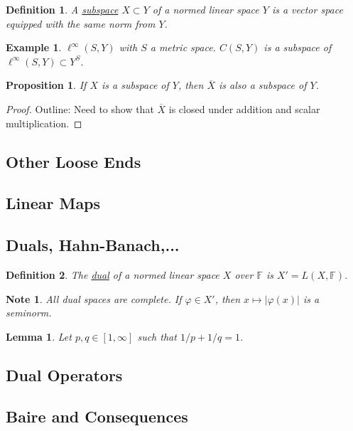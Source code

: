 \documentclass[letterpaper,twoside,11pt]{article}
\theoremstyle{mystyle}
\newtheorem{definition}{Definition}[section]
\newtheorem{lemma}[theorem]{Lemma}
\newtheorem{prop}{Proposition}[section]
\newtheorem*{ex}{Example}
\newtheorem*{note}{Note}
\begin{document}
\begin{definition}
  A \underline{subspace} $X\subset Y$ of a normed linear space $Y$ is a vector space equipped with the same norm from $Y$. 
\end{definition}
\begin{ex}
  $\ell^\infty (S, Y)$ with $S$ a metric space. $C(S,Y)$ is a subspace of $\ell^\infty (S, Y)\subset Y^S$. 
\end{ex}
\begin{prop}
  If $X$ is a subspace of $Y$, then $\overline X $ is also a subspace of $Y$. 
\end{prop}
\begin{proof}
  Outline: Need to show that $\overline X $ is closed under addition and scalar multiplication. 
\end{proof}






\subsection{Other Loose Ends}
\subsection{Linear Maps}
\subsection{Duals, Hahn-Banach,...}

\begin{definition}
  The \underline{dual} of a normed linear space $X$ over $\mathbb F$ is $X'=L(X,\mathbb F)$. 
\end{definition}

\begin{note}
  All dual spaces are complete. If $\varphi \in X'$, then $x\mapsto |\varphi(x)|$ is a seminorm. 
\end{note}
\begin{lemma}
  Let $p,q\in [1,\infty]$ such that $1/p+1/q=1$. 
\end{lemma}


\subsection{Dual Operators}
\newpage \subsection{Baire and Consequences}
\end{document}
